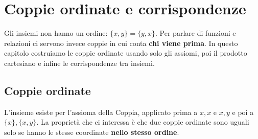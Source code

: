 \chapter{Coppie ordinate e corrispondenze}\label{cap:corrispondenze}

Gli insiemi non hanno un ordine: $\{x, y\} = \{y, x\}$. Per parlare di funzioni e relazioni ci servono invece
coppie in cui conta \textbf{chi viene prima}. In questo capitolo costruiamo le coppie ordinate usando solo gli
assiomi, poi il prodotto cartesiano e infine le corrispondenze tra insiemi.

\section{Coppie ordinate}\label{sec:coppie}


L'insieme esiste per l'assioma della Coppia, applicato prima a $x, x$ e $x, y$ e poi a $\{x\}, \{x, y\}$.
La proprietà che ci interessa è che due coppie ordinate sono uguali solo se hanno le stesse coordinate
\textbf{nello stesso ordine}.

